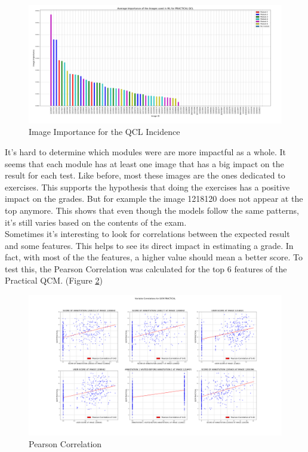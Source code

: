 \documentclass[a4paper,11pt]{report}
\numberwithin{figure}{section} %
\begin{document}
      \begin{figure}[H]
      \centering
      \includegraphics[width=.95\linewidth]{plots/im_importance_PRACTICAL_QCL_2018-04-29_14_33_48.png}
      \caption{Image Importance for the QCL Incidence}
      \label{fig:im_tp4}
      \end{figure}

	It's hard to determine which modules were are more impactful as a whole.
    It seems that each module has at least one image that has a big impact on the result for each test.
	Like before, most these images are the ones dedicated to exercises.
	This supports the hypothesis that doing the exercises has a positive impact on the grades.
	But for example the image 1218120 does not appear at the top anymore.
	This shows that even though the models follow the same patterns, it's still varies based on the contents of the exam.\\

    Sometimes it's interesting  to look for correlations between the expected result and some features.
    This helps to see its direct impact in estimating a grade.
    In fact, with most of the the features, a higher value should mean a better score.
    To test this, the Pearson Correlation was calculated for the top 6 features of the Practical QCM. (Figure \ref{fig:corr_tp})
      \begin{figure}[H]
      \centering
      \includegraphics[width=.95\linewidth]{plots/var_correlation_QCM_PRACTICAL_2018-04-29_14_38_14.png}
      \caption{Pearson Correlation}
      \label{fig:corr_tp}
      \end{figure}
\end{document}
